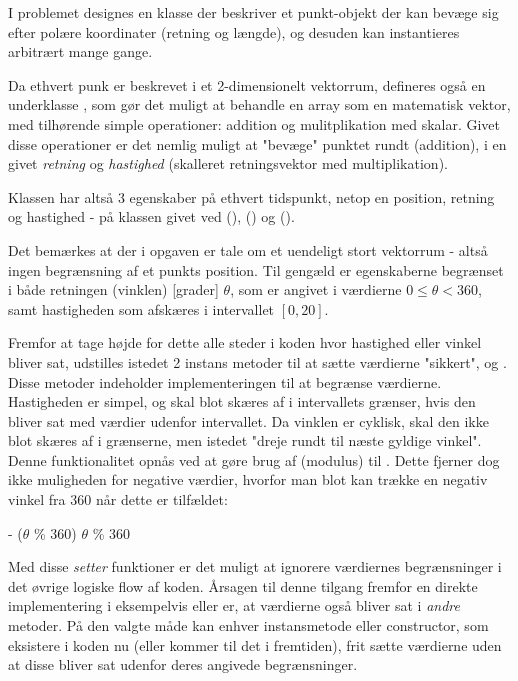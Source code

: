 I problemet designes en klasse  der beskriver et punkt-objekt der kan bevæge sig efter polære koordinater (retning og længde), og desuden kan instantieres arbitrært mange gange.

Da ethvert punk er beskrevet i et 2-dimensionelt vektorrum, defineres også en underklasse , som gør det muligt at behandle en  array som en matematisk vektor, med tilhørende simple operationer: addition og mulitplikation med skalar. Givet disse operationer er det nemlig muligt at "bevæge" punktet rundt (addition), i en givet \textit{retning} og \textit{hastighed} (skalleret retningsvektor med multiplikation).

Klassen  har altså 3 egenskaber på ethvert tidspunkt, netop en position, retning og hastighed - på klassen givet ved  (),  () og  ().

Det bemærkes at der i opgaven er tale om et uendeligt stort vektorrum - altså ingen begrænsning af et punkts position. Til gengæld er egenskaberne begrænset i både retningen (vinklen) [grader\degree] $\theta$, som er angivet i værdierne \(0 \leq \theta < 360\), samt hastigheden som afskæres i intervallet \([0, 20]\).

Fremfor at tage højde for dette alle steder i koden hvor hastighed eller vinkel bliver sat, udstilles istedet 2 instans metoder til at sætte værdierne "sikkert",  og . Disse metoder indeholder implementeringen til at begrænse værdierne. Hastigheden er simpel, og skal blot skæres af i intervallets grænser, hvis den bliver sat med værdier udenfor intervallet. Da vinklen er cyklisk, skal den ikke blot skæres af i grænserne, men istedet "dreje rundt til næste gyldige vinkel". Denne funktionalitet opnås ved at gøre brug af \code{\%} (modulus) til . Dette fjerner dog ikke muligheden for negative værdier, hvorfor man blot kan trække en negativ vinkel fra $360$ når dette er tilfældet:

\begin{algorithm}
  \begin{algorithmic}
       - ($\theta$ \% 360)
    \Else{}
      \Return $\theta$ \% 360
    \EndIf
  \end{algorithmic}
\end{algorithm}

Med disse \textit{setter} funktioner er det muligt at ignorere værdiernes begrænsninger i det øvrige logiske flow af koden. Årsagen til denne tilgang fremfor en direkte implementering i eksempelvis  eller  er, at værdierne også bliver sat i \textit{andre} metoder. På den valgte måde kan enhver instansmetode eller constructor, som eksistere i koden nu (eller kommer til det i fremtiden), frit sætte værdierne uden at disse bliver sat udenfor deres angivede begrænsninger.

